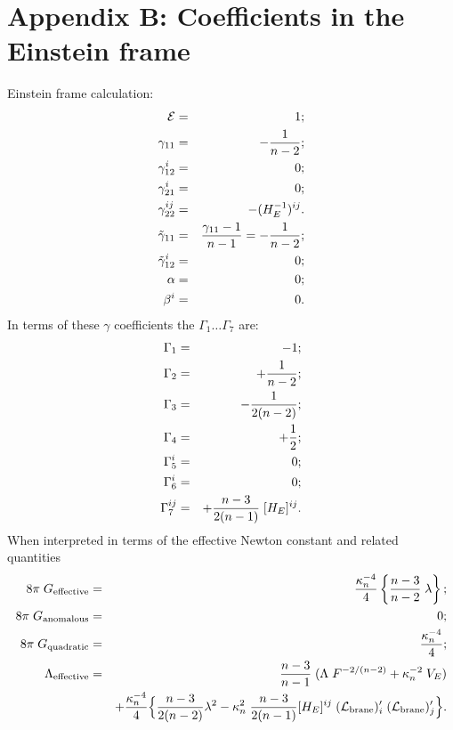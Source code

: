 \documentclass[a4paper,10pt]{article}
\renewcommand{\theequation}{\arabic{section}.\arabic{equation}}
\begin{document}
\appendix
\section*{Appendix B: Coefficients in the Einstein frame}
\label{A:coefficents-in-einstein}
\setcounter{equation}{0}
\renewcommand{\theequation}{B.\arabic{equation}}


Einstein frame calculation:
%
\begin{eqnarray}
{\mathcal E} &=& 1;
\\
\gamma_{11} &=& - {1\over n-2};
\\
\gamma_{12}^i &=& 0;
\\
\gamma_{21}^i &=& 0;
\\
\gamma_{22}^{ij} &=&  - (H_E^{-1})^{ij}.
\\
\tilde\gamma_{11} &=& {\gamma_{11}-1\over n-1} = - {1\over n-2};
\\
\tilde\gamma_{12}^i &=& 0; 
\\
\alpha &=&  0;
\\
\beta^i &=& 0.
\end{eqnarray}
%
In terms of these $\gamma$ coefficients the $\Gamma_1\dots\Gamma_7$
are:
%
\begin{eqnarray}
\Gamma_1 &=& - 1;
\\
\Gamma_2 &=& +{1\over n-2};
\\
\Gamma_3 &=& - {1\over2(n-2)};
\\
\Gamma_4 &=& + {1\over2};
\\
\Gamma_5^i &=& 0;
\\
\Gamma_6^i &=& 0;
\\
\Gamma_7^{ij} &=& +{n-3 \over 2(n-1)} \; [H_E]^{ij}.
\end{eqnarray}
%
When interpreted in terms of the effective Newton constant and related
quantities
%
\begin{eqnarray}
8\pi\;G_{\mathrm{effective}} &=&  
{\kappa_n^{-4}\over4} 
\left\{
{n-3\over n-2}\; \lambda 
\right\};
\\
8\pi\;G_{\mathrm{anomalous}} &=&  
0; 
\\
8\pi\;G_{\mathrm{quadratic}} &=& 
{\kappa_n^{-4}\over4}; 
\\
\Lambda_{\mathrm{effective}} &=&
{n-3 \over n-1} \;(\Lambda \; F^{-2/(n-2)} + \kappa_n^{-2} \; V_E)
\nonumber\\
&&
+ {\kappa_n^{-4}\over4} 
\Big\{ 
{n-3\over2(n-2)} \lambda^2 
-\kappa_n^2 \; {n-3\over2(n-1)} [H_E]^{ij}  \;({\mathcal L}_{\mathrm{brane}})'_i   \;({\mathcal L}_{\mathrm{brane}})'_j
\Big\}.
\end{eqnarray}
%
\end{document}
